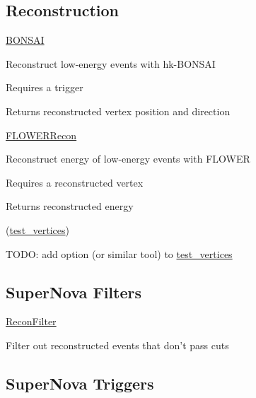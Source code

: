 \subsection*{Reconstruction}


\begin{DoxyItemize}
\item \hyperlink{classBONSAI}{B\-O\-N\-S\-A\-I}
\begin{DoxyItemize}
\item Reconstruct low-\/energy events with hk-\/\-B\-O\-N\-S\-A\-I
\item Requires a trigger
\item Returns reconstructed vertex position and direction
\end{DoxyItemize}
\item \hyperlink{classFLOWERRecon}{F\-L\-O\-W\-E\-R\-Recon}
\begin{DoxyItemize}
\item Reconstruct energy of low-\/energy events with F\-L\-O\-W\-E\-R
\item Requires a reconstructed vertex
\item Returns reconstructed energy
\end{DoxyItemize}
\item (\hyperlink{classtest__vertices}{test\-\_\-vertices})
\begin{DoxyItemize}
\item T\-O\-D\-O\-: add option (or similar tool) to \hyperlink{classtest__vertices}{test\-\_\-vertices}
\end{DoxyItemize}
\end{DoxyItemize}

\subsection*{Super\-Nova Filters}


\begin{DoxyItemize}
\item \hyperlink{classReconFilter}{Recon\-Filter}
\begin{DoxyItemize}
\item Filter out reconstructed events that don't pass cuts
\end{DoxyItemize}
\end{DoxyItemize}

\subsection*{Super\-Nova Triggers}


